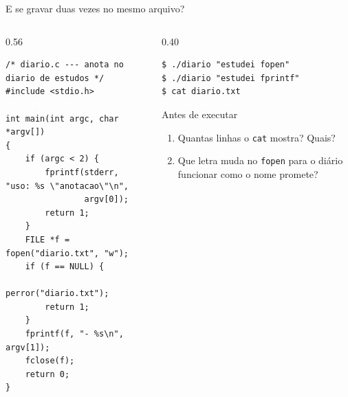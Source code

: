 \documentclass[aspectratio=169]{beamer}
\begin{document}
\begin{frame}[fragile]{E se gravar duas vezes no mesmo arquivo?}
  \vspace{-0.6em}
  \begin{columns}[T]
    \begin{column}{0.56\textwidth}
\begin{lstlisting}[style=codCs]
/* diario.c --- anota no diario de estudos */
#include <stdio.h>

int main(int argc, char *argv[])
{
    if (argc < 2) {
        fprintf(stderr, "uso: %s \"anotacao\"\n",
                argv[0]);
        return 1;
    }
    FILE *f = fopen("diario.txt", "w");
    if (f == NULL) {
        perror("diario.txt");
        return 1;
    }
    fprintf(f, "- %s\n", argv[1]);
    fclose(f);
    return 0;
}
\end{lstlisting}
    \end{column}
    \begin{column}{0.40\textwidth}
\begin{lstlisting}[style=shellS]
$ ./diario "estudei fopen"
$ ./diario "estudei fprintf"
$ cat diario.txt
\end{lstlisting}
      \begin{block}{Antes de executar}
        \small
        \begin{enumerate}
          \item Quantas linhas o \texttt{cat} mostra? Quais?
          \item Que letra muda no \texttt{fopen} para o diário funcionar
            como o nome promete?
        \end{enumerate}
      \end{block}
    \end{column}
  \end{columns}
\end{frame}
\end{document}
